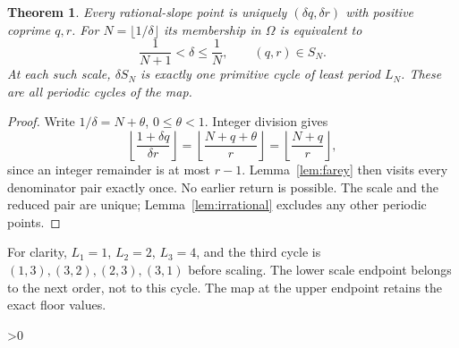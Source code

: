 \documentclass[10pt]{article}
\newtheorem{theorem}{Theorem}
\begin{document}
\begin{theorem}\label{thm:cycles}
Every rational-slope point is uniquely $(\delta q,\delta r)$ with
positive coprime $q,r$. For $N=\lfloor1/\delta\rfloor$ its membership in
$\Omega$ is equivalent to
\[
\frac1{N+1}<\delta\leq\frac1N,\qquad(q,r)\in S_N.
\]
At each such scale, $\delta S_N$ is exactly one primitive cycle of least
period $L_N$. These are all periodic cycles of the map.
\end{theorem}
\begin{proof}
Write $1/\delta=N+\theta$, $0\leq\theta<1$. Integer division gives
\[
\left\lfloor\frac{1+\delta q}{\delta r}\right\rfloor
=\left\lfloor\frac{N+q+\theta}{r}\right\rfloor
=\left\lfloor\frac{N+q}{r}\right\rfloor,
\]
since an integer remainder is at most $r-1$.
Lemma~\ref{lem:farey} then visits every denominator pair exactly once.
No earlier return is possible. The scale and the reduced pair are unique;
Lemma~\ref{lem:irrational} excludes any other periodic points.
\end{proof}
For clarity, $L_1=1$, $L_2=2$, $L_3=4$, and the third cycle is
$(1,3),(3,2),(2,3),(3,1)$ before scaling.
The lower scale endpoint belongs to the next order, not to this cycle.
The map at the upper endpoint retains the exact floor values.

\ifnum\CRevisionRound>0
\end{document}
